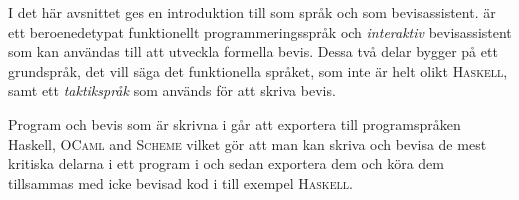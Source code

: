 I det här avsnittet ges en introduktion till \coq som språk och som
bevisassistent. \coq är ett beroenedetypat funktionellt programmeringsspråk och
\emph{interaktiv} bevisassistent som kan användas till att utveckla formella
bevis. Dessa två delar bygger på ett grundspråk, det vill säga det funktionella
språket, som inte är helt olikt \textsc{Haskell}, samt ett \emph{taktikspråk}
som används för att skriva bevis.

Program och bevis som är skrivna i \coq går att exportera till programspråken
Haskell, \textsc{OCaml} and \textsc{Scheme} vilket gör att man kan skriva och
bevisa de mest kritiska delarna i ett program i \coq och sedan exportera dem
och köra dem tillsammas med icke bevisad kod i till exempel \textsc{Haskell}.
